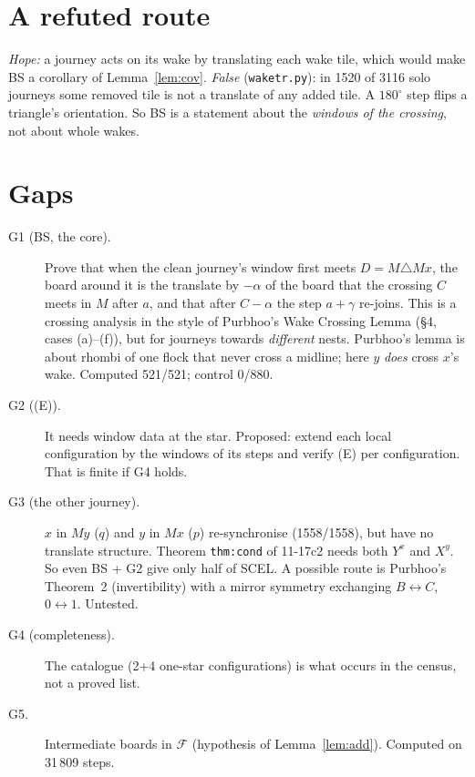 \documentclass[11pt]{article}
\theoremstyle{definition}\newtheorem{definition}[theorem]{Definition}\newtheorem{remark}[theorem]{Remark}
\begin{document}
\section{A refuted route}
\emph{Hope:} a journey acts on its wake by translating each wake tile, which would make BS a corollary of Lemma~\ref{lem:cov}.
\emph{False} (\texttt{waketr.py}): in 1520 of 3116 solo journeys some removed tile is not a translate of any added tile. A $180^\circ$ step flips a triangle's orientation.
So BS is a statement about the \emph{windows of the crossing}, not about whole wakes.

\section{Gaps}\label{sec:gaps}
\begin{description}
\item[G1 (BS, the core).] Prove that when the clean journey's window first meets $D=M\triangle Mx$, the board around it is the translate by $-\alpha$ of the board that the crossing $C$ meets
in $M$ after $a$, and that after $C-\alpha$ the step $a+\gamma$ re-joins. This is a crossing analysis in the style of Purbhoo's Wake Crossing Lemma (\S4, cases (a)--(f)), but for journeys
towards \emph{different} nests. Purbhoo's lemma is about rhombi of one flock that never cross a midline; here $y$ \emph{does} cross $x$'s wake. Computed 521/521; control 0/880.
\item[G2 ((E)).] It needs window data at the star. Proposed: extend each local configuration by the windows of its steps and verify (E) per configuration. That is finite if G4 holds.
\item[G3 (the other journey).] $x$ in $My$ ($q$) and $y$ in $Mx$ ($p$) re-synchronise (1558/1558), but have no translate structure. Theorem \texttt{thm:cond} of 11-17c2 needs both $Y^x$ and $X^y$.
So even BS + G2 give only half of SCEL. A possible route is Purbhoo's Theorem~2 (invertibility) with a mirror symmetry exchanging $B\leftrightarrow C$, $0\leftrightarrow1$. Untested.
\item[G4 (completeness).] The catalogue (2+4 one-star configurations) is what occurs in the census, not a proved list.
\item[G5.] Intermediate boards in $\mathcal F$ (hypothesis of Lemma~\ref{lem:add}). Computed on 31\,809 steps.
\end{description}
\end{document}
